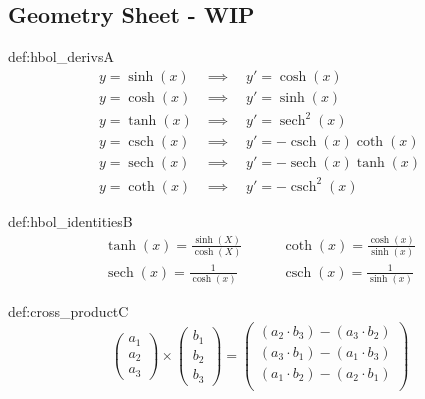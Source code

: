\documentclass[landscape, 8pt]{extarticle}
\DeclareMathOperator{\sech}{sech}
\DeclareMathOperator{\csch}{csch}
\begin{document}
\setlength{\abovedisplayskip}{3.5pt}
\setlength{\belowdisplayskip}{3.5pt}
\setlength{\abovedisplayshortskip}{3.5pt}
\setlength{\belowdisplayshortskip}{3.5pt}

\begin{multicols}{3}
\raggedcolumns %
\section{\huge Geometry Sheet - WIP}
\vspace{-5pt}

\begin{dfn}{def:hbol_derivs}{A}
    \begin{align*}
        y = \sinh(x) & \implies \quad y' = \cosh(x) \\
        y = \cosh(x) & \implies \quad y' = \sinh(x) \\
        y = \tanh(x) & \implies \quad y' = \sech^{2}(x) \\
        y = \csch(x) & \implies \quad y' = -\csch(x)\coth(x) \\
        y = \sech(x) & \implies \quad y' = -\sech(x)\tanh(x) \\
        y = \coth(x) & \implies \quad y' = -\csch^{2}(x)
    \end{align*}
\end{dfn}
\vspace{-5pt}

\begin{dfn}{def:hbol_identities}{B}
    \begin{align*}
        \tanh(x) = \frac{\sinh(X)}{\cosh(X)} & \qquad \coth(x) = \frac{\cosh(x)}{\sinh(x)} \\
        \sech(x) = \frac{1}{\cosh(x)} & \qquad \csch(x) = \frac{1}{\sinh(x)}
    \end{align*}
\end{dfn}
\vspace{-5pt}

\begin{dfn}{def:cross_product}{C}
    \[
    \begin{pmatrix}
        a_{1} \\
        a_{2} \\
        a_{3}
    \end{pmatrix} \times \begin{pmatrix}
        b_{1} \\
        b_{2} \\
        b_{3}
    \end{pmatrix} = \begin{pmatrix}
        (a_{2} \cdot b_{3}) - (a_{3} \cdot b_{2}) \\
        (a_{3} \cdot b_{1}) - (a_{1} \cdot b_{3}) \\
        (a_{1} \cdot b_{2}) - (a_{2} \cdot b_{1}) \\
    \end{pmatrix}
    \]
\end{dfn}
\vspace{-5pt}


\end{multicols}
\end{document}
